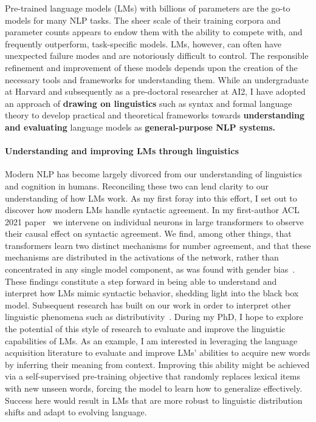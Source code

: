 \documentclass[11pt]{article}
\begin{document}
Pre-trained language models (LMs) with billions of parameters 
are the go-to models for many NLP tasks.
The sheer scale of their training corpora and parameter counts
appears to endow them with the ability to compete with, 
and frequently outperform, task-specific models.
LMs, however, can often have unexpected failure modes 
and are notoriously difficult to control.
The responsible refinement and improvement of these models
depends upon the creation of the necessary tools 
and frameworks for understanding them.
While an undergraduate at Harvard and subsequently as a pre-doctoral researcher 
at AI2, I have adopted an approach of 
\textbf{drawing on linguistics} such as syntax and formal language theory 
to develop practical and theoretical frameworks  
towards \textbf{understanding and evaluating} language models 
as \textbf{general-purpose NLP systems.}

\paragraph{Understanding and improving LMs through linguistics}

Modern NLP has become largely divorced 
from our understanding of linguistics and cognition in humans.
Reconciling these two can lend clarity to our understanding of how LMs work.
As my first foray into this effort, I set out to 
discover how modern LMs handle syntactic agreement.
In my first-author ACL 2021 paper~\cite{Finlayson2021CausalAO}
we intervene on individual neurons in large transformers 
to observe their causal effect on syntactic agreement.
We find, among other things, that transformers learn 
two distinct mechanisms for number agreement,
and that these mechanisms are distributed in the activations of the network, 
rather than concentrated in any single model component,
as was found with gender bias~\cite{Vig2020InvestigatingGB}.
These findings constitute a step forward in being able to understand and interpret
how LMs mimic syntactic behavior, shedding light into the black box model.
Subsequent research has built on our work 
in order to interpret other linguistic phenomena 
such as distributivity~\cite{Ban2022TestingPL}.
During my PhD, I hope to explore the potential of this style of research
to evaluate and improve the linguistic capabilities of LMs. 
As an example, I am interested in leveraging the language acquisition literature
to evaluate and improve LMs' abilities 
to acquire new words by inferring their meaning from context.
Improving this ability might be achieved via a self-supervised pre-training objective 
that randomly replaces lexical items with new unseen words, 
forcing the model to learn how to generalize effectively.
Success here would result in LMs that are 
more robust to linguistic distribution shifts
and adapt to evolving language.
\end{document}
